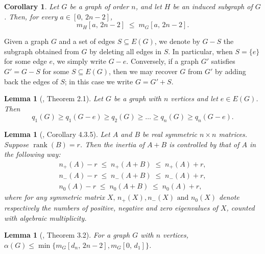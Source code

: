 \documentclass[preprint,12pt]{elsarticle}
\newtheorem{corollary}[theorem]{Corollary}
\newtheorem{lemma}[theorem]{Lemma}
\newcommand{\npos}[1]{n_{+}\!\left(#1\right)}
\newcommand{\nneg}[1]{n_{-}\!\left(#1\right)}
\newcommand{\nzero}[1]{n_{0}\!\left(#1\right)}
\begin{document}
\begin{corollary}\label{cor: subgrafo induzido}
Let $G$ be a graph of order $n$, and let $H$ be an induced subgraph of $G$. Then, for every $a \in [0,\,2n-2]$,
\[
m_H[a,\,2n-2] \;\leq\; m_G[a,\,2n-2].
\] 
\end{corollary}

Given a graph \(G\) and a set of edges \(S \subseteq E(G)\), we denote by \(G - S\) the subgraph obtained from \(G\) by deleting all edges in \(S\). In particular, when \(S = \{e\}\) for some edge \(e\), we simply write \(G - e\). Conversely, if a graph \(G'\) satisfies \(G' = G - S\) for some \(S \subseteq E(G)\), then we may recover \(G\) from \(G'\) by adding back the edges of \(S\); in this case we write \(G = G' + S\).


\begin{lemma}[\cite{cvetkovic2007}, Theorem 2.1]\label{lem: menos_uma_aresta}
Let $G$ be a graph with $n$ vertices and let $e \in E(G)$. Then
\[
q_1(G) \geq q_1(G - e) \geq q_2(G) \geq \dots \geq q_n(G) \geq q_n(G - e).
\]
\end{lemma}

\begin{lemma}[\cite{Horn2012}, Corollary 4.3.5]\label{teo: inercia}
Let $A$ and $B$ be real symmetric $n\times n$ matrices. Suppose $\operatorname{rank}(B)=r$. Then the inertia of $A+B$ is controlled by that of $A$ in the following way:
\begin{align*}
\npos{A}-r \;\le\; \npos{A+B} \;\le\; \npos{A}+r,\\
\nneg{A}-r \;\le\; \nneg{A+B} \;\le\; \nneg{A}+r,\\
\nzero{A}-r \;\le\; \nzero{A+B} \;\le\; \nzero{A}+r,
\end{align*}
where for any symmetric matrix $X, \, \npos{X}, \nneg{X} \text{ and } \nzero{X}$ denote respectively the numbers of positive, negative and zero eigenvalues of $X$, counted with algebraic multiplicity.
\end{lemma}

\begin{lemma}[\cite{xu2024distribution}, Theorem 3.2]\label{teorema: Primeiro do Bo Zhou}
For a graph $G$ with $n$ vertices,\linebreak $\alpha(G) \leq \min\{m_G[d_n,\,2n-2],m_G[0,\,d_1]\}$.
\end{lemma}
\end{document}

